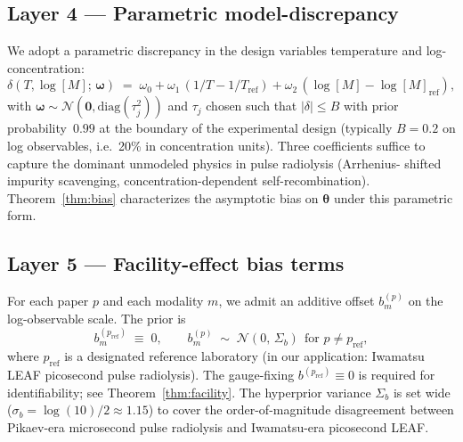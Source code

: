 \documentclass[12pt]{article}
\theoremstyle{plain}
\theoremstyle{definition}
\theoremstyle{remark}
\begin{document}
\subsection{Layer 4 --- Parametric model-discrepancy}\label{sec:framework:disc}

We adopt a parametric discrepancy in the design variables temperature and
log-concentration:
%
\begin{equation}
  \delta(T, \log[M];\,\boldsymbol\omega)
    \;=\; \omega_0 + \omega_1\,(1/T - 1/T_{\mathrm{ref}})
        + \omega_2\,(\log[M] - \log[M]_{\mathrm{ref}}),
  \label{eq:disc}
\end{equation}
%
with $\boldsymbol\omega \sim \mathcal{N}(\mathbf{0}, \mathrm{diag}(\tau_j^2))$
and $\tau_j$ chosen such that $|\delta| \le B$ with prior probability~$0.99$
at the boundary of the experimental design (typically $B = 0.2$ on log
observables, i.e.\ 20\% in concentration units).  Three coefficients suffice
to capture the dominant unmodeled physics in pulse radiolysis (Arrhenius-
shifted impurity scavenging, concentration-dependent self-recombination).
Theorem~\ref{thm:bias} characterizes the asymptotic bias on
$\boldsymbol\theta$ under this parametric form.

\subsection{Layer 5 --- Facility-effect bias terms}\label{sec:framework:facility}

For each paper $p$ and each modality $m$, we admit an additive offset
$b^{(p)}_m$ on the log-observable scale.  The prior is
%
\begin{equation}
  b^{(p_{\mathrm{ref}})}_m \;\equiv\; 0,
  \qquad
  b^{(p)}_m \;\sim\; \mathcal{N}(0,\,\Sigma_b)
    \ \ \text{for } p\ne p_{\mathrm{ref}},
\end{equation}
%
where $p_{\mathrm{ref}}$ is a designated reference laboratory (in our
application: Iwamatsu LEAF picosecond pulse radiolysis).  The gauge-fixing
$b^{(p_{\mathrm{ref}})} \equiv 0$ is required for identifiability; see
Theorem~\ref{thm:facility}.  The hyperprior variance $\Sigma_b$ is set wide
($\sigma_b = \log(10)/2 \approx 1.15$) to cover the order-of-magnitude
disagreement between Pikaev-era microsecond pulse radiolysis and
Iwamatsu-era picosecond LEAF.
\end{document}
